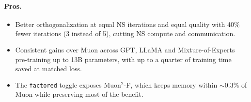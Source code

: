 \paragraph{Pros.}
\begin{itemize}[leftmargin=*]
\item Better orthogonalization at equal NS iterations and equal quality with 40\% fewer
iterations (3 instead of 5), cutting NS compute and communication.
\item Consistent gains over Muon across GPT, LLaMA and Mixture-of-Experts pre-training up
to 13B parameters, with up to a quarter of training time saved at matched loss.
\item The \texttt{factored} toggle exposes Muon$^2$-F, which keeps memory within
$\sim$0.3\% of Muon while preserving most of the benefit.
\end{itemize}

